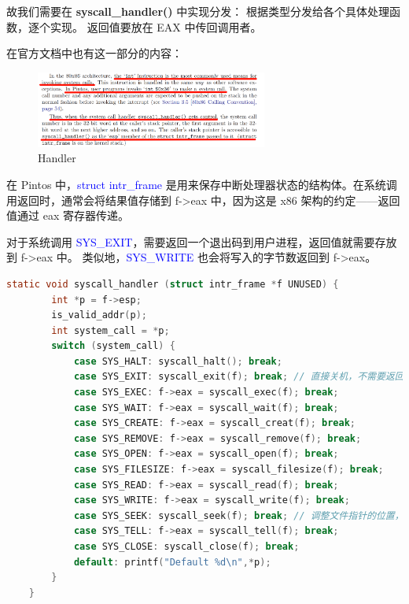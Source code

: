 \documentclass[14pt,a4paper,UTF8,twoside]{article}
\renewcommand{\texttt}[1]{\textcolor{blue}{\ttfamily #1}}
\begin{document}
故我们需要在 \textbf{syscall\_handler()} 中实现分发：
根据类型分发给各个具体处理函数，逐个实现。
返回值要放在 EAX 中传回调用者。

在官方文档中也有这一部分的内容：

\begin{figure}[H]
    \centering
    \includegraphics[width=0.68\textwidth]{img6/handler.png}
    \caption{Handler}
    \label{fig:lab6-6}
\end{figure}


\begin{ctt}
    在 Pintos 中，\texttt{struct intr\_frame} 是用来保存中断处理器状态的结构体。在系统调用返回时，通常会将结果值存储到 f->eax 中，因为这是 x86 架构的约定——返回值通过 eax 寄存器传递。
    
    \vspace{0.5cm}

    对于系统调用 \texttt{SYS\_EXIT}，需要返回一个退出码到用户进程，返回值就需要存放到 f->eax 中。
    类似地，\texttt{SYS\_WRITE} 也会将写入的字节数返回到 f->eax。
\end{ctt}

\begin{lstlisting}[language=C, title= syscall.c]
    static void syscall_handler (struct intr_frame *f UNUSED) {
        int *p = f->esp;
        is_valid_addr(p);
        int system_call = *p;
        switch (system_call) {
            case SYS_HALT: syscall_halt(); break;
            case SYS_EXIT: syscall_exit(f); break; // 直接关机，不需要返回值，故是 void function
            case SYS_EXEC: f->eax = syscall_exec(f); break;
            case SYS_WAIT: f->eax = syscall_wait(f); break;
            case SYS_CREATE: f->eax = syscall_creat(f); break;
            case SYS_REMOVE: f->eax = syscall_remove(f); break;
            case SYS_OPEN: f->eax = syscall_open(f); break;
            case SYS_FILESIZE: f->eax = syscall_filesize(f); break;
            case SYS_READ: f->eax = syscall_read(f); break;
            case SYS_WRITE: f->eax = syscall_write(f); break;
            case SYS_SEEK: syscall_seek(f); break; // 调整文件指针的位置，也不需要返回值
            case SYS_TELL: f->eax = syscall_tell(f); break;
            case SYS_CLOSE: syscall_close(f); break;
            default: printf("Default %d\n",*p);
        }
    }
\end{lstlisting}
\end{document}
